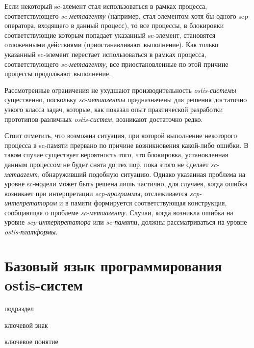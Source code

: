 Если некоторый sc-элемент стал использоваться в рамках процесса, соответствующего \textit{sc-метаагенту} (например, стал элементом хотя бы одного scp-оператора, входящего в данный процесс), то все процессы, в блокировки соответствующие которым попадает указанный sc-элемент, становятся отложенными действиями (приостанавливают выполнение). Как только указанный sc-элемент перестает использоваться в рамках процесса, соответствующего \textit{sc-метаагенту}, все приостановленные по этой причине процессы продолжают выполнение.

Рассмотренные ограничения не ухудшают производительность \textit{ostis-системы} существенно, поскольку \textit{sc-мета\-аген\-ты} предназначены для решения достаточно узкого класса задач, которые, как показал опыт практической разработки прототипов различных \textit{ostis-систем}, возникают достаточно редко.
	
Стоит отметить, что возможна ситуация, при которой выполнение некоторого процесса в sc-памяти прервано по причине возникновения какой-либо ошибки. В таком случае существует вероятность того, что блокировка, установленная данным процессом не будет снята до тех пор, пока этого не сделает \textit{sc-метаагент}, обнаруживший подобную ситуацию. Однако указанная проблема на уровне sc-модели может быть решена лишь частично, для случаев, когда ошибка возникает при интерпретации \textit{scp-программы}, отслеживается \textit{scp-интепретатором} и в памяти формируется соответствующая конструкция, сообщающая о проблеме \textit{sc-метаагенту}. Случаи, когда возникла ошибка на уровне \textit{scp-интерпретатора} или \textit{sc-памяти}, должны рассматриваться на уровне \textit{ostis-платформы}.

\section{Базовый язык программирования ostis-систем}
\label{sec_ps_scp}

\begin{SCn}
\begin{scnrelfromlist}{подраздел}
\end{scnrelfromlist}
\begin{scnrelfromlist}{ключевой знак}
\end{scnrelfromlist}
\begin{scnrelfromlist}{ключевое понятие}
\end{scnrelfromlist}
\end{SCn}


